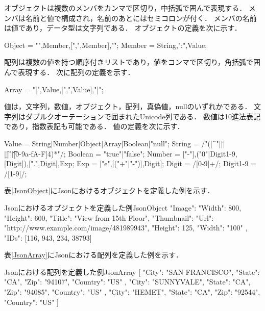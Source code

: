 オブジェクトは複数のメンバをカンマで区切り，中括弧で囲んで表現する．
メンバは名前と値で構成され，名前のあとにはセミコロンが付く．
メンバの名前は値であり，データ型は文字列である．
オブジェクトの定義を次に示す．

\begin{EBNF}
Object = "{",Member,[{",",Member}],"}";
Member = String,":",Value;
\end{EBNF}

配列は複数の値を持つ順序付きリストであり，値をコンマで区切り，角括弧で囲んで表現する．
次に配列の定義を示す．

\begin{EBNF}
Array = "[",Value,[{",",Value}],"]";
\end{EBNF}

値は，文字列，数値，オブジェクト，配列，真偽値，nullのいずれかである．
文字列はダブルクオーテーションで囲まれたUnicode列である．
数値は10進法表記であり，指数表記も可能である．
値の定義を次に示す．

\begin{EBNF}
Value = String|Number|Object|Array|Boolean|"null";
String = /"([^"\]|\n|\"|\\|\b|\f|\r|\t|\u[0-9a-fA-F]{4})*"/;
Boolean = "true"|"false";
Number = ["-"],("0"|Digit1-9,[Digit]),[".",Digit],Exp;
Exp = ["e",[("+"|"-")],Digit];
Digit = /[0-9]+/;
Digit1-9 = /[1-9]/;
\end{EBNF}

表\ref{JsonObject}にJsonにおけるオブジェクトを定義した例を示す．

\begin{FileToPage}{Jsonにおけるオブジェクトを定義した例}{JsonObject}
{
  "Image":{
    "Width":  800,
    "Height": 600,
    "Title":  "View from 15th Floor",
    "Thumbnail":{
      "Url":    "http://www.example.com/image/481989943",
      "Height": 125,
      "Width":  "100"
    },
    "IDs": [116, 943, 234, 38793]
  }
}
\end{FileToPage}

表\ref{JsonArray}にJsonにおける配列を定義した例を示す．

\begin{FileToPage}{Jsonにおける配列を定義した例}{JsonArray}
[
  {
    "City":      "SAN FRANCISCO",
    "State":     "CA",
    "Zip":       "94107",
    "Country":   "US"
  },
  {
    "City":      "SUNNYVALE",
    "State":     "CA",
    "Zip":       "94085",
    "Country":   "US"
  },
  {
    "City":      "HEMET",
    "State":     "CA",
    "Zip":       "92544",
    "Country":   "US"
  }
]
\end{FileToPage}

